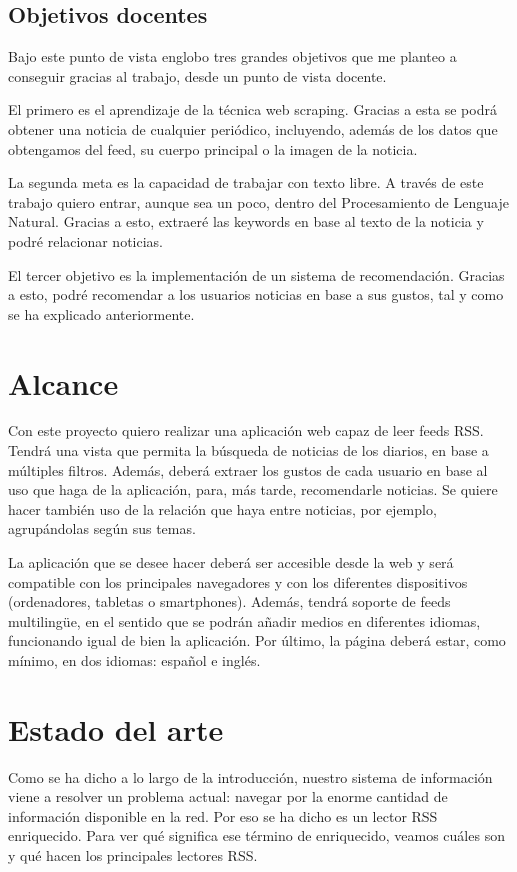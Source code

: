 \subsection{Objetivos docentes}

Bajo este punto de vista englobo tres grandes objetivos que me planteo a conseguir gracias al trabajo, desde un punto de vista docente.

El primero es el aprendizaje de la técnica web scraping. Gracias a esta se podrá obtener una noticia de cualquier periódico, incluyendo, además de los datos que obtengamos del feed, su cuerpo principal o la imagen de la noticia.

La segunda meta es la capacidad de trabajar con texto libre. A través de este trabajo quiero entrar, aunque sea un poco, dentro del Procesamiento de Lenguaje Natural. Gracias a esto, extraeré las keywords en base al texto de la noticia y podré relacionar noticias.

El tercer objetivo es la implementación de un sistema de recomendación. Gracias a esto, podré recomendar a los usuarios noticias en base a sus gustos, tal y como se ha explicado anteriormente.


\section{Alcance}\label{sec:alcance}

Con este proyecto quiero realizar una aplicación web capaz de leer feeds RSS. Tendrá una vista que permita la búsqueda de noticias de los diarios, en base a múltiples filtros. Además, deberá extraer los gustos de cada usuario en base al uso que haga de la aplicación, para, más tarde, recomendarle noticias. Se quiere hacer también uso de la relación que haya entre noticias, por ejemplo, agrupándolas según sus temas.

La aplicación que se desee hacer deberá ser accesible desde la web y será compatible con los principales navegadores y con los diferentes dispositivos (ordenadores, tabletas o smartphones). Además, tendrá soporte de feeds multilingüe, en el sentido que se podrán añadir medios en diferentes idiomas, funcionando igual de bien la aplicación. Por último, la página deberá estar, como mínimo, en dos idiomas: español e inglés.


\section{Estado del arte}\label{sec:arte}

Como se ha dicho a lo largo de la introducción, nuestro sistema de información viene a resolver un problema actual: navegar por la enorme cantidad de información disponible en la red. Por eso se ha dicho es un lector RSS enriquecido. Para ver qué significa ese término de enriquecido, veamos cuáles son y qué hacen los principales lectores RSS.


 
